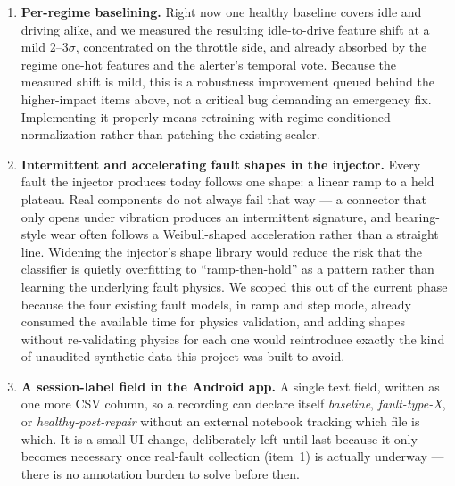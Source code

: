 \begin{enumerate}
  \item \textbf{Per-regime baselining.} Right now one healthy baseline
    covers idle and driving alike, and we measured the resulting
    idle-to-drive feature shift at a mild 2--3$\sigma$, concentrated on the
    throttle side, and already absorbed by the regime one-hot features and
    the alerter's temporal vote. Because the measured shift is mild, this
    is a robustness improvement queued behind the higher-impact items
    above, not a critical bug demanding an emergency fix. Implementing it
    properly means retraining with regime-conditioned normalization rather
    than patching the existing scaler.

  \item \textbf{Intermittent and accelerating fault shapes in the
    injector.} Every fault the injector produces today follows one shape:
    a linear ramp to a held plateau. Real components do not always fail
    that way --- a connector that only opens under vibration produces an
    intermittent signature, and bearing-style wear often follows a
    Weibull-shaped acceleration rather than a straight line. Widening the
    injector's shape library would reduce the risk that the classifier is
    quietly overfitting to ``ramp-then-hold'' as a pattern rather than
    learning the underlying fault physics. We scoped this out of the
    current phase because the four existing fault models, in ramp and step
    mode, already consumed the available time for physics validation, and
    adding shapes without re-validating physics for each one would
    reintroduce exactly the kind of unaudited synthetic data this project
    was built to avoid.

  \item \textbf{A session-label field in the Android app.} A single text
    field, written as one more CSV column, so a recording can declare
    itself \emph{baseline}, \emph{fault-type-X}, or \emph{healthy-post-repair}
    without an external notebook tracking which file is which. It is a
    small UI change, deliberately left until last because it only becomes
    necessary once real-fault collection (item~1) is actually underway ---
    there is no annotation burden to solve before then.
\end{enumerate}
